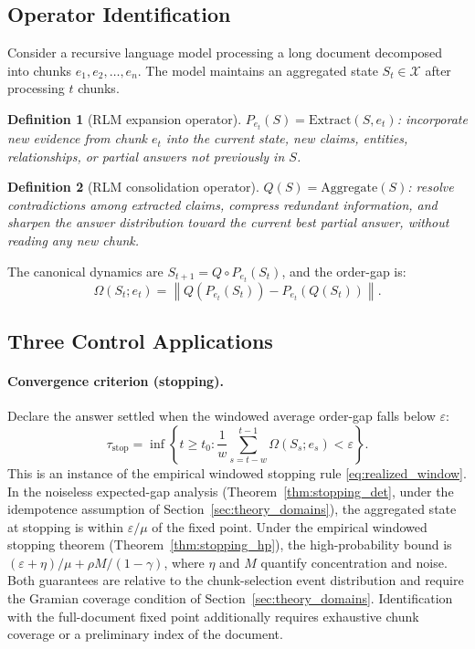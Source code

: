 \documentclass[12pt,a4paper]{article}
\newtheorem{definition}{Definition}[section]
\newcommand{\X}{\mathcal{X}}
\newcommand{\norm}[1]{\left\lVert#1\right\rVert}
\newcommand{\Ogap}{\Omega}
\begin{document}
\subsection{Operator Identification}

Consider a recursive language model processing a long document decomposed into
chunks $e_1, e_2, \ldots, e_n$. The model maintains an aggregated state
$S_t \in \X$ after processing $t$ chunks.

\begin{definition}[RLM expansion operator]
\label{def:rlm_expansion}
$P_{e_t}(S) = \mathrm{Extract}(S, e_t)$: incorporate new evidence from chunk
$e_t$ into the current state, new claims, entities, relationships, or partial
answers not previously in $S$.
\end{definition}

\begin{definition}[RLM consolidation operator]
\label{def:rlm_consolidation}
$Q(S) = \mathrm{Aggregate}(S)$: resolve contradictions among extracted claims,
compress redundant information, and sharpen the answer distribution toward the
current best partial answer, without reading any new chunk.
\end{definition}

The canonical dynamics are $S_{t+1} = Q \circ P_{e_t}(S_t)$, and the
order-gap is:
\[
\Ogap(S_t; e_t) = \norm{Q(P_{e_t}(S_t)) - P_{e_t}(Q(S_t))}.
\]

\subsection{Three Control Applications}

\paragraph{Convergence criterion (stopping).}
Declare the answer settled when the windowed average order-gap falls below
$\varepsilon$:
\begin{equation}
\label{eq:rlm_stopping}
\tau_{\mathrm{stop}} = \inf\!\left\{t \geq t_0 :
  \frac{1}{w}\sum_{s=t-w}^{t-1} \Ogap(S_s; e_s) < \varepsilon \right\}.
\end{equation}
This is an instance of the empirical windowed stopping rule
\eqref{eq:realized_window}. In the noiseless expected-gap analysis
(Theorem~\ref{thm:stopping_det}, under the idempotence assumption of
Section~\ref{sec:theory_domains}), the aggregated state at stopping is
within $\varepsilon/\mu$ of the fixed point. Under the empirical windowed
stopping theorem (Theorem~\ref{thm:stopping_hp}), the
high-probability bound is $(\varepsilon + \eta)/\mu + \rho M/(1-\gamma)$,
where $\eta$ and $M$ quantify concentration and noise. Both guarantees are
relative to the chunk-selection event distribution and require the Gramian
coverage condition of Section~\ref{sec:theory_domains}. Identification with
the full-document fixed point additionally requires exhaustive chunk coverage
or a preliminary index of the document.
\end{document}
